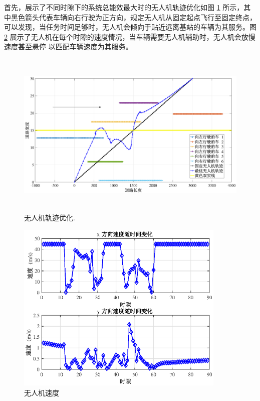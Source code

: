 首先，展示了不同时隙下的系统总能效最大时的无人机轨迹优化如图 \ref{UAV Trajectory Optimisation} 所示，其中黑色箭头代表车辆向右行驶为正方向，规定无人机从固定起点飞行至固定终点，
可以发现，当任务时间足够时，无人机会倾向于贴近远离基站的车辆为其服务。图 \ref{UAVspeed} 展示了无人机在每个时隙的速度情况，当车辆需要无人机辅助时，无人机会放慢速度甚至悬停
以匹配车辆速度为其服务。
\begin{figure}[H]
\centering
\includegraphics[width=16cm,height=8cm]{figures//chap4//小轨迹.eps}   %
\caption{无人机轨迹优化.}
\label{UAV Trajectory Optimisation}
\end{figure}
\begin{figure}[H]
\centering
\includegraphics[width=10cm]{figures//chap4//无人机速度.eps}
\caption{无人机速度}
\label{UAVspeed}
\end{figure}

